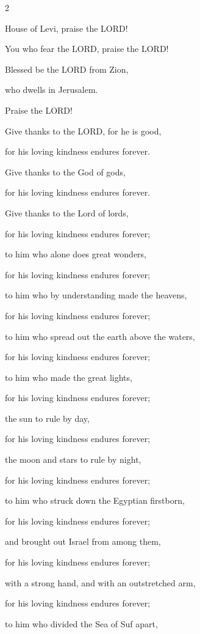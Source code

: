 \begin{multicols}{2}
	
	\myverse{}House of Levi, praise the LORD!
	
	You who fear the LORD, praise the LORD!
	
	
	\myverse{}Blessed be the LORD from Zion,
	
	who dwells in Jerusalem.
	
	Praise the LORD!
	
	
	\mychapter{} \myverse*{}Give thanks to the LORD, for he is good,
	
	\quad\quad\quad for his loving kindness endures forever.
	
	
	\myverse{}Give thanks to the God of gods,
	
	for his loving kindness endures forever.
	
	
	\myverse{}Give thanks to the Lord of lords,
	
	for his loving kindness endures forever;
	
	
	\myverse{}to him who alone does great wonders,
	
	for his loving kindness endures forever;
	
	
	\myverse{}to him who by understanding made the heavens,
	
	for his loving kindness endures forever;
	
	
	\myverse{}to him who spread out the earth above the waters,
	
	for his loving kindness endures forever;
	
	
	\myverse{}to him who made the great lights,
	
	for his loving kindness endures forever;
	
	
	\myverse{}the sun to rule by day,
	
	for his loving kindness endures forever;
	
	
	\myverse{}the moon and stars to rule by night,
	
	for his loving kindness endures forever;
	
	
	\myverse{}to him who struck down the Egyptian firstborn,
	
	for his loving kindness endures forever;
	
	
	\myverse{}and brought out Israel from among them,
	
	for his loving kindness endures forever;
	
	
	\myverse{}with a strong hand, and with an outstretched arm,
	
	for his loving kindness endures forever;
	
	
	\myverse{}to him who divided the Sea of Suf apart,
	

\end{multicols}
